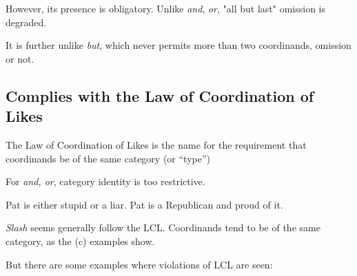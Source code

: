 \documentclass[charis,linguex,biblatex]{glossa}
\begin{document}
However, its presence is obligatory. Unlike \textit{and}, \textit{or}, "all but last" omission is degraded.

\begin{exe}
\end{exe}

It is further unlike \textit{but}, which never permits more than two coordinands, omission or not.

\begin{exe}
\end{exe}


\subsection{Complies with the Law of Coordination of Likes}

The Law of Coordination of Likes is the name for the requirement that coordinands be of the same category (or ``type'') \citep{Schacter:1977}

For \textit{and, or}, category identity is too restrictive.

\begin{exe}
		\ex Pat is either stupid or a liar.
		\ex Pat is a Republican and proud of it. \citep[117]{Sag:1985}
\end{exe}

\textit{Slash} seems generally follow the LCL. Coordinands tend to be of the same category, as the (c) examples show.

\begin{exe}
\ex \begin{xlista}
	\end{xlista}
\ex	\begin{xlista}
	\end{xlista}
\end{exe}

But there are some examples where violations of LCL are seen:
\end{document}
